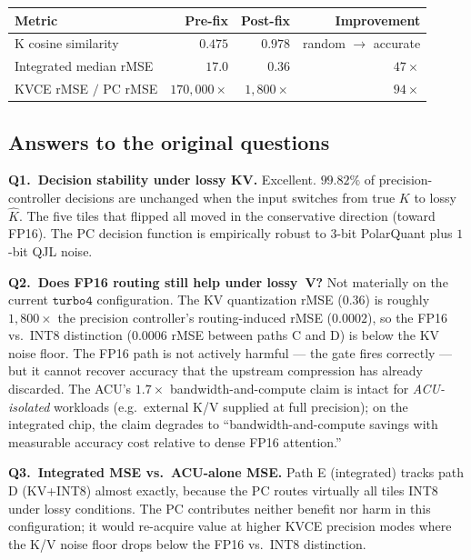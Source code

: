 \documentclass[11pt]{article}
\begin{document}
\begin{center}
\renewcommand{\arraystretch}{1.15}
\begin{tabular}{@{}lrrr@{}}
\toprule
Metric & Pre-fix & Post-fix & Improvement \\
\midrule
K cosine similarity                 & $0.475$    & $0.978$ & random $\rightarrow$ accurate \\
Integrated median rMSE              & $17.0$     & $0.36$  & $47\times$ \\
KVCE rMSE $/$ PC rMSE               & $170{,}000\times$ & $1{,}800\times$ & $94\times$ \\
\bottomrule
\end{tabular}
\end{center}

\subsection*{Answers to the original questions}

\textbf{Q1.\ Decision stability under lossy KV.}
Excellent. $99.82\%$ of precision-controller decisions are
unchanged when the input switches from true $K$ to lossy $\hat K$.
The five tiles that flipped all moved in the conservative
direction (toward FP16). The PC decision function is empirically
robust to $3$-bit PolarQuant plus $1$-bit QJL noise.

\textbf{Q2.\ Does FP16 routing still help under lossy~V?}
Not materially on the current $\texttt{turbo4}$ configuration.
The KV quantization rMSE ($0.36$) is roughly $1{,}800\times$ the
precision controller's routing-induced rMSE ($0.0002$), so the
FP16 vs.\ INT8 distinction ($0.0006$ rMSE between paths C and D)
is below the KV noise floor. The FP16 path is not actively harmful
--- the gate fires correctly --- but it cannot recover accuracy
that the upstream compression has already discarded. The
ACU's $1.7\times$ bandwidth-and-compute claim is intact for
\emph{ACU-isolated} workloads (e.g.\ external K/V supplied at
full precision); on the integrated chip, the claim degrades to
``bandwidth-and-compute savings with measurable accuracy cost
relative to dense FP16 attention.''

\textbf{Q3.\ Integrated MSE vs.\ ACU-alone MSE.}
Path E (integrated) tracks path D (KV+INT8) almost exactly,
because the PC routes virtually all tiles INT8 under lossy
conditions. The PC contributes neither benefit nor harm in this
configuration; it would re-acquire value at higher KVCE precision
modes where the K/V noise floor drops below the FP16 vs.\ INT8
distinction.
\end{document}
